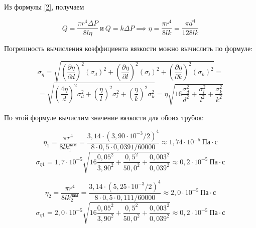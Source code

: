 \documentclass[a4paper,12pt]{article}
\begin{document}
\clearpage

Из формулы \eqref{2}, получаем

\begin{equation}
    Q = \frac{\pi r^4 \Delta P}{8 l \eta} \ \text{и} \ Q = k \Delta P \implies \eta = \frac{\pi r^4}{8 l k} = \frac{\pi d^4}{128 l k}
\end{equation}

Погрешность вычисления коэффициента вязкости можно вычислить по формуле:

\begin{equation*}
    \sigma_\eta = \sqrt{
    \left( \frac{\partial \eta}{\partial d} \right)^2 (\sigma_{d})^2 + 
    \left( \frac{\partial \eta}{\partial l} \right)^2 (\sigma_{l})^2 + 
    \left( \frac{\partial \eta}{\partial k} \right)^2 (\sigma_{k})^2
    } = 
\end{equation*}
\begin{equation}
    = \sqrt{
    \left(\frac{4 \eta}{d} \right)^2 \sigma_{d}^2 + 
    \left( \frac{\eta}{l} \right)^2 \sigma_{l}^2 + \left( \frac{\eta}{k} \right)^2 \sigma_{k}^2
    } = \eta \sqrt{
    16 \frac{\sigma_{d}^2}{d^2} + \frac{\sigma_{l}^2}{l^2} + \frac{\sigma_{k}^2}{k^2}
    }
\end{equation}

По этой формуле вычислим значение вязкости для обоих трубок:

\begin{equation*}
    \eta_1 = \frac{\pi r^4}{8 l k_1^\text{лам}} = \frac{3,14 \cdot ({3,90 \cdot 10^{-3} / 2})^4}{8 \cdot 0,5 \cdot 0,0391 / 60000} \approx 1,74 \cdot 10^{-5} \ \text{Па} \cdot \text{с}
\end{equation*}
\begin{equation*}
    \sigma_{\eta 1} = 1,7 \cdot 10^{-5} \sqrt{16 \frac{{0,05}^2}{{3,90}^2} + \frac{{0,5}^2}{{50,0}^2} + \frac{{0,003}^2}{{0,039}^2}} \approx 0,2 \cdot 10^{-5} \ \text{Па} \cdot \text{с}
\end{equation*}



\begin{equation*}
    \eta_2 = \frac{\pi r^4}{8 l k_2^\text{лам}} = \frac{3,14 \cdot ({5,25 \cdot 10^{-3} / 2})^4}{8 \cdot 0,5 \cdot 0,111 / 60000} \approx 2,0 \cdot 10^{-5} \ \text{Па} \cdot \text{с}
\end{equation*}
\begin{equation*}
    \sigma_{\eta 1} = 2,0 \cdot 10^{-5} \sqrt{16 \frac{{0,05}^2}{{3,90}^2} + \frac{{0,5}^2}{{50,0}^2} + \frac{{0,003}^2}{{0,039}^2}} \approx 0,2 \cdot 10^{-5} \ \text{Па} \cdot \text{с}
\end{equation*}
\end{document}
